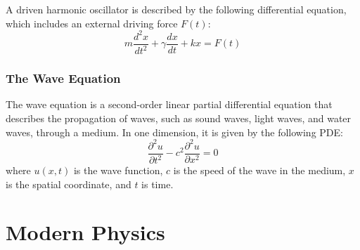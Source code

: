 \documentclass[11pt]{report}
\begin{document}
\begin{definition}
    A driven harmonic oscillator is described by the following differential equation, which includes an external driving force $F(t)$:
    \begin{equation}
        m \frac{d^2 x}{dt^2} + \gamma \frac{dx}{dt} + kx = F(t)   
    \end{equation}
\end{definition}
\subsection{The Wave Equation}

\begin{definition}
    The wave equation is a second-order linear partial differential equation that describes the propagation of waves, such as sound waves, light waves, and water waves, through a medium. In one dimension, it is given by the following PDE:
    \begin{equation}
        \frac{\partial^2 u}{\partial t^2} - c^2 \frac{\partial^2 u}{\partial x^2} = 0
    \end{equation}
    where \( u(x,t) \) is the wave function, \( c \) is the speed of the wave in the medium, \( x \) is the spatial coordinate, and \( t \) is time.
\end{definition}
 

\chapter{Modern Physics}
\end{document}
